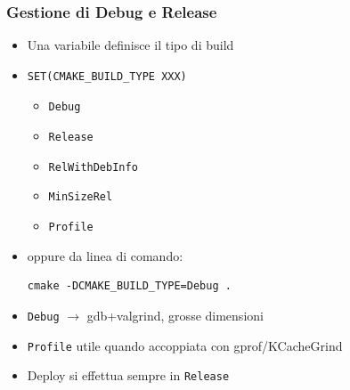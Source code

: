 \documentclass[10pt] {beamer}
\begin{document}

\begin{frame}[fragile]
\frametitle{Gestione di Debug e Release}
\begin{itemize}
\item<1-> Una variabile definisce il tipo di build
\item<1->
\begin{verbatim}
SET(CMAKE_BUILD_TYPE XXX)
\end{verbatim}
    \begin{itemize}
    \item \texttt{Debug}
    \item \texttt{Release}
    \item \texttt{RelWithDebInfo}
    \item \texttt{MinSizeRel}
    \item \texttt{Profile}
    \end{itemize}
\item<2-> oppure da linea di comando:
\begin{verbatim}
cmake -DCMAKE_BUILD_TYPE=Debug .
\end{verbatim}

\item<3-> \texttt{Debug} $\rightarrow$ gdb+valgrind, grosse dimensioni
\item<4-> \texttt{Profile} utile quando accoppiata con gprof/KCacheGrind
\item<5-> Deploy si effettua sempre in \texttt{Release}
\end{itemize}
\end{frame}

\end{document}

